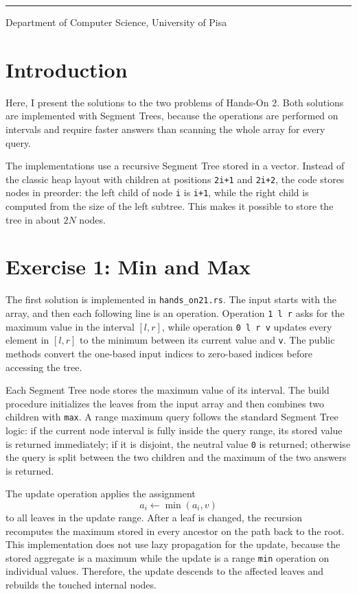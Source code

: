 \documentclass[11pt,a4paper]{article}
\begin{document}
\vspace{0.8cm}
{\color{LightGray}\rule{\textwidth}{0.8pt}\par}
\vspace{0.2cm}
{\small\color{SoftGray}Department of Computer Science, University of Pisa\par}

\newpage
\section*{Introduction}
Here, I present the solutions to the two problems of Hands-On 2. Both
solutions are implemented with Segment Trees, because the operations are
performed on intervals and require faster answers than scanning the whole
array for every query.

The implementations use a recursive Segment Tree stored in a vector. Instead
of the classic heap layout with children at positions \texttt{2i+1} and
\texttt{2i+2}, the code stores nodes in preorder: the left child of node
\texttt{i} is \texttt{i+1}, while the right child is computed from the size of
the left subtree. This makes it possible to store the tree in about
\(2N\) nodes.

\section*{Exercise 1: Min and Max}
The first solution is implemented in \texttt{hands\_on21.rs}. The input starts
with the array, and then each following line is an operation. Operation
\texttt{1 l r} asks for the maximum value in the interval \([l,r]\), while
operation \texttt{0 l r v} updates every element in \([l,r]\) to the minimum
between its current value and \texttt{v}. The public methods convert the
one-based input indices to zero-based indices before accessing the tree.

Each Segment Tree node stores the maximum value of its interval. The build
procedure initializes the leaves from the input array and then combines two
children with \texttt{max}. A range maximum query follows the standard
Segment Tree logic: if the current node interval is fully inside the query
range, its stored value is returned immediately; if it is disjoint, the
neutral value \texttt{0} is returned; otherwise the query is split between the
two children and the maximum of the two answers is returned.

The update operation applies the assignment
\[
    a_i \leftarrow \min(a_i, v)
\]
to all leaves in the update range. After a leaf is changed, the recursion
recomputes the maximum stored in every ancestor on the path back to the root.
This implementation does not use lazy propagation for the update, because the
stored aggregate is a maximum while the update is a range \texttt{min}
operation on individual values. Therefore, the update descends to the affected
leaves and rebuilds the touched internal nodes.
\end{document}
